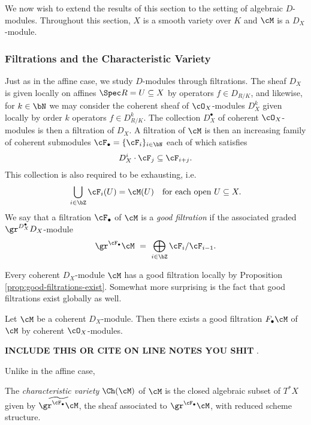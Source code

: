 We now wish to extend the results of this section to the setting of algebraic $D$-modules. Throughout this section, $X$ is a smooth variety over $K$ and $\cM$ is a $D_X$-module.

\subsubsection{Filtrations and the Characteristic Variety}
Just as in the affine case, we study $D$-modules through filtrations. The sheaf $D_X$ is given locally on affines $\Spec R = U \subseteq X$ by operators $f\in D_{R/K}$, and likewise, for $k \in \bN$ we may consider the coherent sheaf of $\cO_X$-modules $D^k_X$ given locally by order $k$ operators $f \in D^k_{R/K}$. The collection $D^\bullet_X$ of coherent $\cO_X$-modules is then a filtration of $D_X$. A filtration of $\cM$ is then an increasing family of coherent submodules $\cF_\bullet = \{\cF_i\}_{i\in \bN}$ each of which satisfies
\begin{align*}
	D^i_X\cdot \cF_j \subseteq \cF_{i+j}.
\end{align*}
This collection is also required to be exhausting, i.e.
\begin{align*}
	\bigcup_{i \in \bZ} \cF_i(U) = \cM(U) \hspace{1em} \text{for each open} ~ U \subseteq X.
\end{align*}
We say that a filtration $\cF_\bullet$ of $\cM$ is a \emph{good filtration} if the associated graded $\gr^{D^\bullet_X} D_X$-module
\begin{align*}
	\gr^{\cF_\bullet} \cM ~=~ \bigoplus_{i\in \bZ} \cF_i/\cF_{i-1}.
\end{align*}

Every coherent $D_X$-module $\cM$ has a good filtration locally by Proposition \ref{prop:good-filtrations-exist}. Somewhat more surprising is the fact that good filtrations exist globally as well.
\begin{lem}\label{lem:global-good-filtrations-exist}
	Let $\cM$ be a coherent $D_X$-module. Then there exists a good filtration $F_\bullet \cM$ of $\cM$ by coherent $\cO_X$-modules.
\end{lem}
\begin{prf}
	\textbf{INCLUDE THIS OR CITE ON LINE NOTES YOU SHIT} \cite{cschnell}.
\end{prf}
Unlike in the affine case, 
\begin{defn}\label{defn:characteristic-variety}
	The \emph{characteristic variety} $\Ch(\cM)$ of $\cM$ is the closed algebraic subset of $T^*X$ given by $\widetilde{\gr^{\cF_\bullet}\cM}$, the sheaf associated to $\gr^{\cF_\bullet}\cM$, with reduced scheme structure.
\end{defn}

